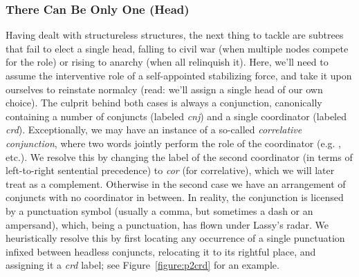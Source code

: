 \subsubsection{There Can Be Only One (Head)}
Having dealt with structureless structures, the next thing to tackle are subtrees that fail to elect a single head, falling to civil war (when multiple nodes compete for the role) or rising to anarchy (when all relinquish it).
Here, we'll need to assume the interventive role of a self-appointed stabilizing force, and take it upon ourselves to reinstate normalcy (read: we'll assign a single head of our own choice).
The culprit behind both cases is always a conjunction, canonically containing a number of conjuncts (labeled \textit{cnj}) and a single coordinator (labeled \textit{crd}).
Exceptionally, we may have an instance of a so-called \textit{correlative conjunction}, where two words jointly perform the role of the coordinator (e.g. , etc.).
We resolve this by changing the label of the second coordinator (in terms of left-to-right sentential precedence) to \textit{cor} (for correlative), which we will later treat as a complement.
Otherwise in the second case we have an arrangement of conjuncts with no coordinator in between.
In reality, the conjunction is licensed by a punctuation symbol (usually a comma, but sometimes a dash or an ampersand), which, being a punctuation, has flown under Lassy's radar.
We heuristically resolve this by first locating any occurrence of a single punctuation infixed between headless conjuncts, relocating it to its rightful place, and assigning it a \textit{crd} label; see Figure~\ref{figure:p2crd} for an example.

